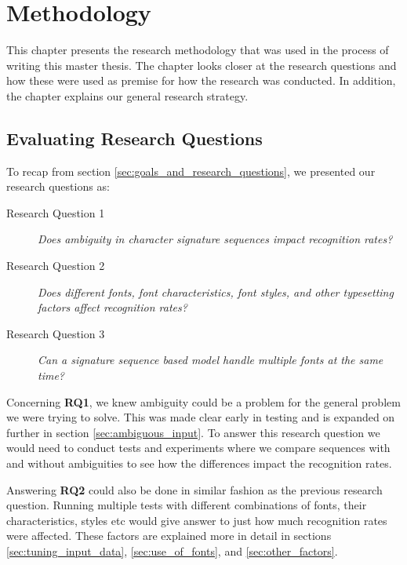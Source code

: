 
\chapter{Methodology}
\label{ch:methodology}
This chapter presents the research methodology that was used in the process of writing this master thesis. The chapter looks closer at the research questions and how these were used as premise for how the research was conducted. In addition, the chapter explains our general research strategy.


\section{Evaluating Research Questions}
\label{sec:research_questions_and_approach}
To recap from section \ref{sec:goals_and_research_questions}, we presented our research questions as:

\begin{description}
    \item[Research Question 1]{\textit{Does ambiguity in character signature sequences impact recognition rates?}}
    \item[Research Question 2]{\textit{Does different fonts, font characteristics, font styles, and other typesetting factors affect recognition rates?}}
    \item[Research Question 3]{\textit{Can a signature sequence based model handle multiple fonts at the same time?}}
\end{description}

Concerning \textbf{RQ1}, we knew ambiguity could be a problem for the general problem we were trying to solve. This was made clear early in testing and is expanded on further in section \ref{sec:ambiguous_input}. To answer this research question we would need to conduct tests and experiments where we compare sequences with and without ambiguities to see how the differences impact the recognition rates.

Answering \textbf{RQ2} could also be done in similar fashion as the previous research question. Running multiple tests with different combinations of fonts, their characteristics, styles etc would give answer to just how much recognition rates were affected. These factors are explained more in detail in sections \ref{sec:tuning_input_data}, \ref{sec:use_of_fonts}, and \ref{sec:other_factors}.

